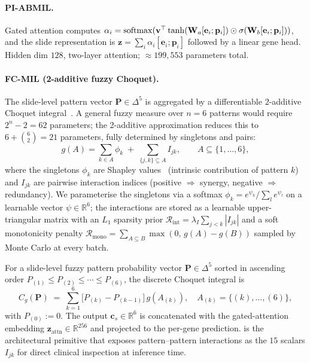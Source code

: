 \paragraph{PI-ABMIL.}
Gated attention\cite{ilse2018attention} computes
$\alpha_i = \operatorname{softmax}(\mathbf{v}^\top \tanh(\mathbf{W}_a
[\mathbf{e}_i;\mathbf{p}_i]) \odot \sigma(\mathbf{W}_b
[\mathbf{e}_i;\mathbf{p}_i]))$, and the slide representation is
$\mathbf{z} = \sum_i \alpha_i [\mathbf{e}_i;\mathbf{p}_i]$
followed by a linear gene head.
Hidden dim $128$, two-layer attention; $\approx 199{,}553$
parameters total.

\paragraph{FC-MIL (2-additive fuzzy Choquet).}
The slide-level pattern vector $\mathbf{P}\in\Delta^5$ is
aggregated by a differentiable
$2$-additive Choquet
integral~\cite{grabisch1996application}.
A general fuzzy measure over $n\!=\!6$ patterns would require
$2^{n}\!-\!2\!=\!62$ parameters; the 2-additive approximation
reduces this to $6 + \binom{6}{2}\!=\!21$ parameters, fully
determined by singletons and pairs:
\begin{equation}
g(A) = \sum_{k\in A}\phi_k \;+\; \sum_{\{j,k\}\subseteq A} I_{jk},
\qquad A \subseteq \{1,\ldots,6\},
\label{eq:fuzzy_measure}
\end{equation}
where the singletons $\phi_k$ are Shapley
values~\cite{shapley1953value} (intrinsic contribution of pattern
$k$) and $I_{jk}$ are pairwise interaction indices
(positive $\Rightarrow$ synergy, negative $\Rightarrow$ redundancy).
We parameterise the singletons via a softmax
$\phi_k = e^{\psi_k}/\sum_l e^{\psi_l}$ on a learnable vector
$\psi\in\mathbb{R}^{6}$; the interactions are stored as a learnable
upper-triangular matrix with an $L_1$ sparsity prior
$\mathcal{R}_\text{int}=\lambda_I\sum_{j<k}|I_{jk}|$ and a soft
monotonicity penalty
$\mathcal{R}_\text{mono} =
\sum_{A\subseteq B}\max(0,\,g(A)\!-\!g(B))$
sampled by Monte Carlo at every batch.

For a slide-level fuzzy pattern probability vector
$\mathbf{P}\in\Delta^{5}$ sorted in ascending order
$P_{(1)}\!\leq\!P_{(2)}\!\leq\!\cdots\!\leq\!P_{(6)}$, the discrete
Choquet integral is
\begin{equation}
C_g(\mathbf{P}) \;=\; \sum_{k=1}^{6}
\bigl[P_{(k)}-P_{(k-1)}\bigr]\, g\!\left(A_{(k)}\right),
\quad A_{(k)} \!=\! \{(k),\ldots,(6)\},
\label{eq:choquet_integral}
\end{equation}
with $P_{(0)}\!:=\!0$.
The output $\mathbf{c}_s\in\mathbb{R}^{6}$ is concatenated with the
gated-attention embedding $\mathbf{z}_\mathrm{attn}\in\mathbb{R}^{256}$
and projected to the per-gene prediction.
\fcmil{} is the architectural primitive that exposes
pattern--pattern interactions as the $15$ scalars $I_{jk}$ for
direct clinical inspection at inference time.

